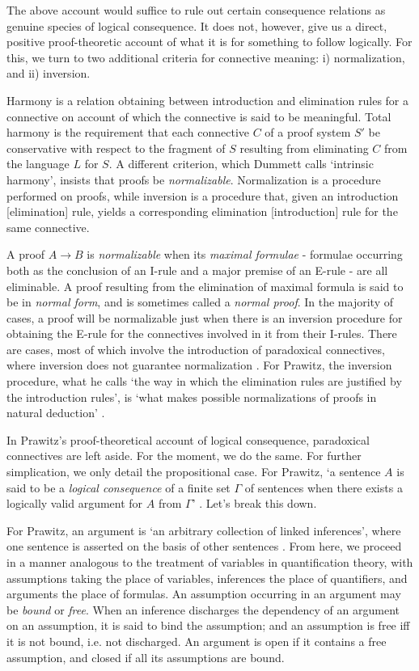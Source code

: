 \documentclass[]{article}
\begin{document}
The above account would suffice to rule out certain consequence relations as genuine species of logical consequence. It does not, however, give us a direct, positive proof-theoretic account of what it is for something to follow logically. For this, we turn to two additional criteria for connective meaning: i) normalization, and ii) inversion. 

Harmony is a relation obtaining between introduction and elimination rules for a connective on account of which the connective is said to be meaningful. Total harmony is the requirement that each connective $C$ of a proof system $S'$ be conservative with respect to the fragment of $S$ resulting from eliminating $C$ from the language $L$ for $S$. A different criterion, which Dummett calls `intrinsic harmony', insists that proofs be \textit{normalizable}. Normalization is a procedure performed on proofs, while inversion is a procedure that, given an introduction [elimination] rule, yields a corresponding elimination [introduction] rule for the same connective. 

A proof $A \rightarrow B$ is \textit{normalizable} when its \textit{maximal formulae} - formulae occurring both as the conclusion of an I-rule and a major premise of an E-rule - are all eliminable. A proof resulting from the elimination of maximal formula is said to be in \textit{normal form}, and is sometimes called a \textit{normal proof}. In the majority of cases, a proof will be normalizable just when there is an inversion procedure for obtaining the E-rule for the connectives involved in it from their I-rules. There are cases, most of which involve the introduction of paradoxical connectives, where inversion does not guarantee normalization \cite{Read2010}. For Prawitz, the inversion procedure, what he calls `the way in which the elimination rules are justified by the introduction rules', is `what makes possible normalizations of proofs in natural deduction' \cite[160]{Prawitz1985}.

In Prawitz's proof-theoretical account of logical consequence, paradoxical connectives are left aside. For the moment, we do the same. For further simplication, we only detail the propositional case. For Prawitz, `a sentence $A$ is said to be a \textit{logical consequence} of a finite set $\Gamma$ of sentences when there exists a logically valid argument for $A$ from $\Gamma$' \cite[166]{Prawitz1985}. Let's break this down. 

For Prawitz, an argument is `an arbitrary collection of linked inferences', where one sentence is asserted on the basis of other sentences \cite[166]{Prawitz1985}. From here, we proceed in a manner analogous to the treatment of variables in quantification theory, with assumptions taking the place of variables, inferences the place of quantifiers, and arguments the place of formulas. An assumption occurring in an argument may be \textit{bound} or \textit{free}. When an inference discharges the dependency of an argument on an assumption, it is said to bind the assumption; and an assumption is free iff it is not bound, i.e. not discharged. An argument is open if it contains a free assumption, and closed if all its assumptions are bound.
\end{document}
